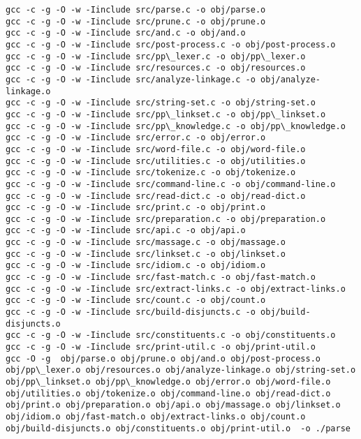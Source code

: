 \documentclass[11pt]{article}
\begin{document}
    \begin{Verbatim}[commandchars=\\\{\}]
gcc -c -g -O -w -Iinclude src/parse.c -o obj/parse.o
gcc -c -g -O -w -Iinclude src/prune.c -o obj/prune.o
gcc -c -g -O -w -Iinclude src/and.c -o obj/and.o
gcc -c -g -O -w -Iinclude src/post-process.c -o obj/post-process.o
gcc -c -g -O -w -Iinclude src/pp\_lexer.c -o obj/pp\_lexer.o
gcc -c -g -O -w -Iinclude src/resources.c -o obj/resources.o
gcc -c -g -O -w -Iinclude src/analyze-linkage.c -o obj/analyze-linkage.o
gcc -c -g -O -w -Iinclude src/string-set.c -o obj/string-set.o
gcc -c -g -O -w -Iinclude src/pp\_linkset.c -o obj/pp\_linkset.o
gcc -c -g -O -w -Iinclude src/pp\_knowledge.c -o obj/pp\_knowledge.o
gcc -c -g -O -w -Iinclude src/error.c -o obj/error.o
gcc -c -g -O -w -Iinclude src/word-file.c -o obj/word-file.o
gcc -c -g -O -w -Iinclude src/utilities.c -o obj/utilities.o
gcc -c -g -O -w -Iinclude src/tokenize.c -o obj/tokenize.o
gcc -c -g -O -w -Iinclude src/command-line.c -o obj/command-line.o
gcc -c -g -O -w -Iinclude src/read-dict.c -o obj/read-dict.o
gcc -c -g -O -w -Iinclude src/print.c -o obj/print.o
gcc -c -g -O -w -Iinclude src/preparation.c -o obj/preparation.o
gcc -c -g -O -w -Iinclude src/api.c -o obj/api.o
gcc -c -g -O -w -Iinclude src/massage.c -o obj/massage.o
gcc -c -g -O -w -Iinclude src/linkset.c -o obj/linkset.o
gcc -c -g -O -w -Iinclude src/idiom.c -o obj/idiom.o
gcc -c -g -O -w -Iinclude src/fast-match.c -o obj/fast-match.o
gcc -c -g -O -w -Iinclude src/extract-links.c -o obj/extract-links.o
gcc -c -g -O -w -Iinclude src/count.c -o obj/count.o
gcc -c -g -O -w -Iinclude src/build-disjuncts.c -o obj/build-disjuncts.o
gcc -c -g -O -w -Iinclude src/constituents.c -o obj/constituents.o
gcc -c -g -O -w -Iinclude src/print-util.c -o obj/print-util.o
gcc -O -g  obj/parse.o obj/prune.o obj/and.o obj/post-process.o obj/pp\_lexer.o obj/resources.o obj/analyze-linkage.o obj/string-set.o obj/pp\_linkset.o obj/pp\_knowledge.o obj/error.o obj/word-file.o obj/utilities.o obj/tokenize.o obj/command-line.o obj/read-dict.o obj/print.o obj/preparation.o obj/api.o obj/massage.o obj/linkset.o obj/idiom.o obj/fast-match.o obj/extract-links.o obj/count.o obj/build-disjuncts.o obj/constituents.o obj/print-util.o  -o ./parse 

    \end{Verbatim}
\end{document}
